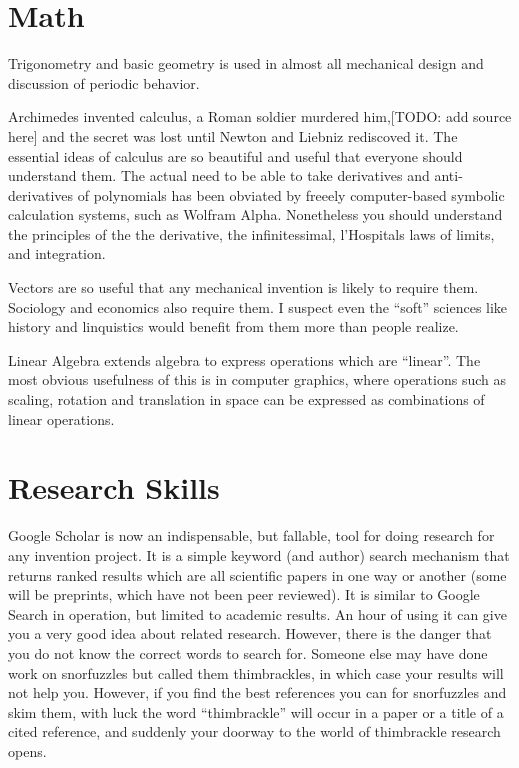 \documentclass[
	fontsize=10pt, %
	twoside=false, %
	secnumdepth=1, %
]{kaobook}
\begin{document}
\section{Math}

Trigonometry and basic geometry is used in almost all mechanical
design and discussion of periodic behavior.

Archimedes invented calculus, a Roman soldier murdered him,[TODO: add source here]
and the secret was lost until Newton and Liebniz rediscoved it.
The essential ideas of calculus are so beautiful and useful
that everyone should understand them. The actual need to be
able to take derivatives and anti-derivatives of
polynomials has been obviated by freeely computer-based symbolic
calculation systems, such as Wolfram Alpha.
Nonetheless you should understand the principles of the
the derivative, the infinitessimal, l'Hospitals laws of limits,
and integration.

Vectors are so useful that any mechanical invention is
likely to require them. Sociology and economics also require them.
I suspect even the ``soft'' sciences
like history and linquistics would benefit from them more than people realize.

Linear Algebra extends algebra to express operations which are ``linear''.
The most obvious usefulness of this is in computer graphics, where operations
such as scaling, rotation and translation in space can be expressed as
combinations of linear operations.

\section{Research Skills}
Google Scholar is now an indispensable, but fallable, tool for doing research for
any invention project.
It is a simple keyword (and author) search mechanism that returns ranked results
which are all scientific papers in one way or another (some will be preprints, which have not been peer reviewed). It is similar to Google Search in operation,
but limited to academic results.
An hour of using it can give you a very good idea about related research.
However, there is the danger that you do not know the correct words to
search for.
Someone else may have done work on snorfuzzles but called them thimbrackles,
in which case your results will not help you. However, if you find the
best references you can for snorfuzzles and skim them, with luck the word ``thimbrackle''
will occur in a paper or a title of a cited reference, and suddenly
your doorway to the world of thimbrackle research opens.
\end{document}
